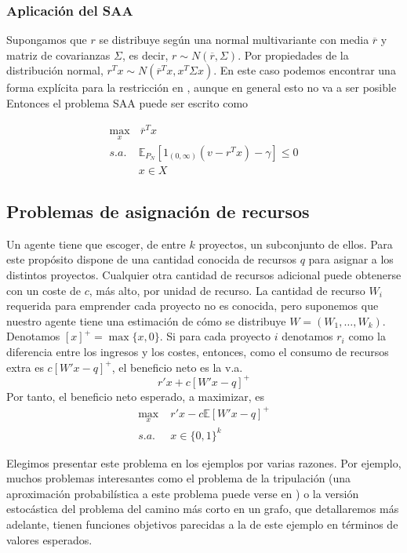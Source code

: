 \documentclass[twoside,a4paper,openright,12pt]{book}
\newcommand{\E}{\mathbb{E}}
\providecommand{\posi}[1]{\left[#1\right]^+}
\begin{document}
\subsubsection*{Aplicación del SAA}

Supongamos que $r$ se distribuye según una normal multivariante con media $\overline{r}$ y matriz de covarianzas $\Sigma$, es decir, $r\sim N(\overline{r},\Sigma)$. Por propiedades de la distribución normal, $r^Tx \sim N(\overline{r}^Tx,x^T\Sigma x)$. En este caso podemos encontrar una forma explícita para la restricción en \cite{convexop}, aunque en general esto no va a ser posible Entonces el problema SAA puede ser escrito como

\begin{align*}
\max_{x}&\,{ \overline{r}^Tx}  \nonumber\\ 
s.a.\;  & \E_{P_N}[1_{(0,\infty)}(v-r^Tx)  -\gamma]\leq 0\\
& x\in X \nonumber
\end{align*}


\newpage
\subsection{Problemas de asignación de recursos}

Un agente tiene que escoger, de entre $k$ proyectos, un subconjunto de ellos. Para este propósito dispone de una cantidad conocida de recursos $q$ para asignar a los distintos proyectos. Cualquier otra cantidad de recursos adicional puede obtenerse con un coste de $c$, más alto, por unidad de recurso. La cantidad de recurso $W_i$ requerida para emprender cada proyecto no es conocida, pero suponemos que nuestro agente tiene una estimación de cómo se distribuye $W=(W_1,\dotsc,W_k)$. Denotamos $\posi{x}=\max\{x,0\}$. Si para cada proyecto $i$ denotamos $r_i$ como la diferencia entre los ingresos y los costes, entonces, como el consumo de recursos extra es $c\left[W'x-q\right]^+$, el beneficio neto es la v.a. 
$$
r'x + c\left[W'x-q\right]^+
$$
Por tanto, el beneficio neto esperado, a maximizar, es
\begin{align*}	
\max_x&\; r'x  -c\E\posi{W'x-q}\tag{5}\label{eq:5}\\
s.a.& \; x\in\{0,1\}^k
\end{align*}

Elegimos presentar este problema en los ejemplos por varias razones. Por ejemplo, muchos problemas interesantes como el problema de la tripulación (una aproximación probabilística a este problema puede verse en \cite{avion}) o la versión estocástica del problema del camino más corto en un grafo, que detallaremos más adelante, tienen funciones objetivos parecidas a la de este ejemplo en términos de valores esperados.
\end{document}
